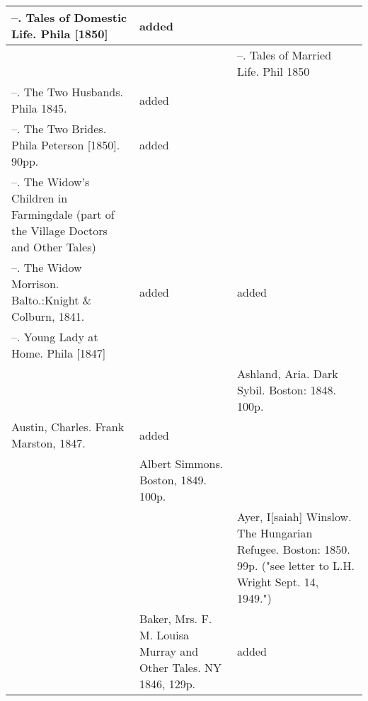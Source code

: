 \begin{longtable}[c]{|p{5cm}|p{5cm}|p{5cm}|}
--. Tales of Domestic Life. Phila {[}1850{]} & added &  \\ \hline
 &  & --. Tales of Married Life. Phil 1850 \\ \hline
--. The Two Husbands. Phila 1845. & added &  \\ \hline
--. The Two Brides. Phila Peterson {[}1850{]}. 90pp. & added &  \\ \hline
--. The Widow's Children in Farmingdale (part of the Village Doctors and Other Tales) &  &  \\ \hline
--. The Widow Morrison. Balto.:Knight \& Colburn, 1841. & added & added \\ \hline
--. Young Lady at Home. Phila {[}1847{]} &  &  \\ \hline
 &  & Ashland, Aria. Dark Sybil. Boston: 1848. 100p. \\ \hline
Austin, Charles. Frank Marston, 1847. & added &  \\ \hline
 & Albert Simmons. Boston, 1849. 100p. &  \\ \hline
 &  & Ayer, I{[}saiah{]} Winslow. The Hungarian Refugee. Boston: 1850. 99p. ("see letter to L.H. Wright Sept. 14, 1949.") \\ \hline
 & Baker, Mrs. F. M.  Louisa Murray and Other Tales. NY 1846, 129p. & added \\ \hline 
\end{longtable}
